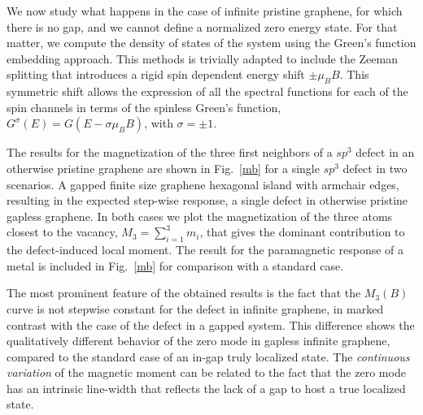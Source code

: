 \medskip
We now study what happens in the case of infinite pristine graphene, for which there is no gap, and we cannot define a normalized zero energy state. For that matter, we compute the density of states of the system using the Green's function embedding approach. %
This methods is trivially adapted to include the Zeeman splitting that introduces a rigid spin dependent energy shift $\pm\mu_B B$. This symmetric shift allows the expression of all the spectral functions for each of the spin channels in terms of the spinless Green's function, $G^\sigma(E)=G(E-\sigma \mu_BB)$, with $\sigma= \pm 1$.


The results for the magnetization of the three first neighbors of a $sp^3$ defect in an otherwise pristine graphene are shown in Fig.~\ref{mb} for a single $sp^3$ defect in two scenarios. A gapped finite size graphene hexagonal island with armchair edges, resulting in the expected step-wise response, a single defect in otherwise pristine gapless graphene.
In both cases we plot  the magnetization of the three atoms closest to the vacancy,
$M_3=\sum^3_{i=1}m_i$, that gives the dominant contribution to the defect-induced local moment. {The result for the paramagnetic response of a metal is included in Fig.~\ref{mb} for comparison with a standard case}.

The most prominent feature of the obtained results is the fact that the $M_3(B)$ curve is not stepwise constant for the defect in infinite graphene, in marked contrast with the case of the defect in a gapped system.
This difference shows the qualitatively different behavior of the zero mode in gapless infinite graphene, compared to the standard case of an in-gap truly localized state. The \emph{continuous variation} of the magnetic moment can be related to the fact that the zero mode has an intrinsic line-width that reflects the lack of a gap to host a true localized state.




